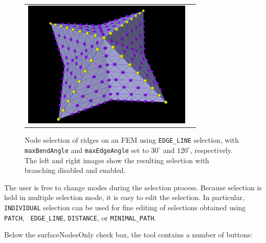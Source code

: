 \documentclass{article}
\begin{document}
\begin{figure}[h]
\begin{center}
\begin{tabular}{cc}
\includegraphics[width=3.2in]{images/nodeEdgeSelectBranching}
\fi
\end{tabular}
\end{center}
\caption{Node selection of ridges on an FEM using {\tt EDGE\_LINE}
selection, with {\tt maxBendAngle} and {\tt maxEdgeAngle} set to
$30^\circ$ and $120^\circ$, respectively. The left and right images
show the resulting selection with branching disabled and enabled.}
\label{nodeEdgeSelect:fig}
\end{figure}

The user is free to change modes during the selection process. Because
selection is held in multiple selection mode, it is easy to edit the
selection. In particular, {\tt INDIVIDUAL} selection can be used for
fine editing of selections obtained using {\tt PATCH}, {\tt
EDGE\_LINE}, {\tt DISTANCE}, or {\tt MINIMAL\_PATH}.

Below the {\sf surfaceNodesOnly} check box, the tool contains a number
of buttons:
\end{document}
